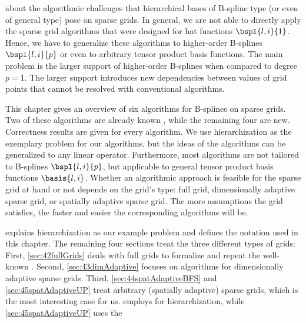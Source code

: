 
\label{chap:40algorithms}

about the algorithmic challenges
that hierarchical bases of B-spline type (or even of general type) pose
on sparse grids.
In general, we are not able to directly apply the sparse grid algorithms
that were designed for hat functions $\bspl{l,i}{1}$.
Hence, we have to generalize these algorithms
to higher-order B-splines $\bspl{l,i}{p}$
or even to arbitrary tensor product basis functions.
The main problem is the larger support
of higher-order B-splines when compared to degree $p = 1$.
The larger support introduces new dependencies between
values of grid points that cannot be resolved with conventional algorithms.

This chapter gives an overview of six algorithms for B-splines
on sparse grids.
Two of these algorithms are already known
,
while the remaining four are new.
Correctness results are given for every algorithm.
We use hierarchization as the exemplary problem for our algorithms,
but the ideas of the algorithms can be generalized to any linear operator.
Furthermore, most algorithms are not tailored to B-splines $\bspl{l,i}{p}$,
but applicable to general tensor product basis functions $\basis{l,i}$.
Whether an algorithmic approach is feasible for the sparse grid at hand
or not depends on the grid's type:
full grid, dimensionally adaptive sparse grid, or
spatially adaptive sparse grid.
The more assumptions the grid satisfies, the faster and
easier the corresponding algorithms will be.

 explains hierarchization as our example problem
and defines the notation used in this chapter.
The remaining four sections treat the three different types of grids:
First, \cref{sec:42fullGrids} deals with full grids to formalize and repeat
the well-known \up.
Second, \cref{sec:43dimAdaptive} focuses on algorithms for
dimensionally adaptive sparse grids.
Third, \cref{sec:44spatAdaptiveBFS} and \cref{sec:45spatAdaptiveUP}
treat arbitrary (spatially adaptive) sparse grids,
which is the most interesting case for us.
 employs \bfs for hierarchization,
while \cref{sec:45spatAdaptiveUP} uses the \up{}

